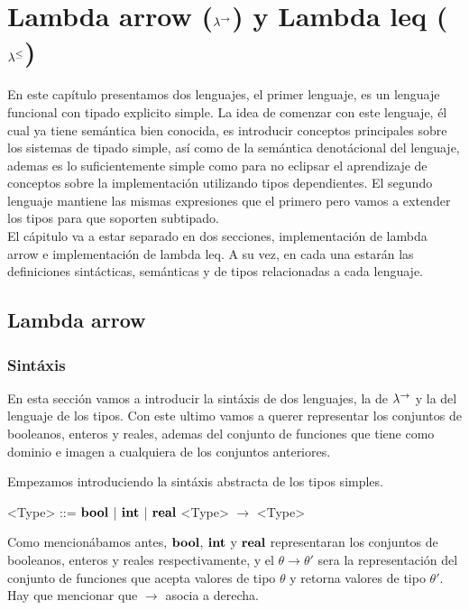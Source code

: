 \chapter{Lambda arrow ($\lambda^{\rightarrow}$) y Lambda leq ($\lambda^{\leq}$)}
\label{chap:lambdaarrow}

En este cap\'itulo presentamos dos lenguajes, el primer lenguaje, es un
lenguaje funcional con tipado explicito simple. La idea de comenzar con 
este lenguaje, \'el cual ya tiene sem\'antica bien conocida, es introducir
conceptos principales sobre los sistemas de tipado simple, as\'i
como de la sem\'antica denot\'acional del lenguaje, ademas es lo 
suficientemente simple como para no eclipsar el aprendizaje de 
conceptos sobre la implementaci\'on utilizando tipos dependientes.
El segundo lenguaje mantiene las mismas expresiones que el primero
pero vamos a extender los tipos para que soporten subtipado.\\

El c\'apitulo va a estar separado en dos secciones, implementaci\'on 
de lambda arrow e implementaci\'on de lambda leq. A su vez, en cada
una estar\'an las definiciones sint\'acticas, sem\'anticas y de tipos
relacionadas a cada lenguaje.

\section{Lambda arrow}

\subsection{Sint\'axis}

En esta secci\'on vamos a introducir la sint\'axis de dos lenguajes, 
la de $\lambda^{\rightarrow}$ y la del lenguaje de los tipos.
Con este ultimo vamos a querer representar los conjuntos de booleanos, enteros
y reales, ademas del conjunto de funciones que tiene como dominio
e imagen a cualquiera de los conjuntos anteriores.

Empezamos introduciendo la sint\'axis abstracta de los tipos simples.

\setlength{\grammarindent}{6em}
\begin{grammar}

<Type> ::= $\textbf{bool}$ | $\textbf{int}$ | $\textbf{real}$
\alt <Type> $\rightarrow$ <Type>

\end{grammar}

Como mencion\'abamos antes, $\textbf{bool}$, $\textbf{int}$ y $\textbf{real}$ representaran 
los conjuntos de booleanos, enteros y reales respectivamente, y el
$\theta \rightarrow \theta'$ sera la representaci\'on del conjunto
de funciones que acepta valores de tipo $\theta$ y retorna valores
de tipo $\theta'$. Hay que mencionar que $\rightarrow$ asocia a derecha.\\

